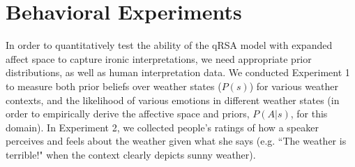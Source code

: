 \documentclass[10pt,letterpaper]{article}
\begin{document}
\section{Behavioral Experiments}
In order to quantitatively test the ability of the qRSA model with expanded affect space to capture ironic interpretations, we need appropriate prior distributions, as well as human interpretation data.
We conducted Experiment 1 to measure both prior beliefs over weather states ($P(s)$) for various weather contexts, and the likelihood of various emotions in different weather states (in order to empirically derive the affective space and priors, $P(A | s)$, for this domain).
In Experiment 2, we collected people's ratings of how a speaker perceives and feels about the weather given what she says (e.g. ``The weather is terrible!" when the context clearly depicts sunny weather).

%


\end{document}
